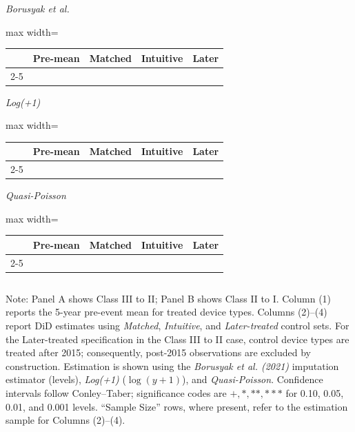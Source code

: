 \documentclass[letterpaper,12pt]{article}
\theoremstyle{definition}
\begin{document}
\begin{table}[t]
\begin{threeparttable}
\begin{minipage}[t]{0.49\textwidth}
\emph{Borusyak et al.}\par
\begin{adjustbox}{max width=\linewidth}
\begin{tabular}{@{}lcccc@{}}
\toprule
 & Pre-mean & Matched & Intuitive & Later \\
\cmidrule(lr){2-5}

\bottomrule
\end{tabular}
\end{adjustbox}\vspace{6pt}

\emph{Log(+1)}\par
\begin{adjustbox}{max width=\linewidth}
\begin{tabular}{@{}lcccc@{}}
\toprule
 & Pre-mean & Matched & Intuitive & Later \\
\cmidrule(lr){2-5}

\bottomrule
\end{tabular}
\end{adjustbox}\vspace{6pt}

\emph{Quasi-Poisson}\par
\begin{adjustbox}{max width=\linewidth}
\begin{tabular}{@{}lcccc@{}}
\toprule
 & Pre-mean & Matched & Intuitive & Later \\
\cmidrule(lr){2-5}

\bottomrule
\end{tabular}
\end{adjustbox}
\end{minipage}
\begin{tabular*}{\textwidth}{@{}l@{}}
\end{tabular*}

\begin{tablenotes}\footnotesize
\item[] Note: Panel A shows Class III to II; Panel B shows Class II to I. Column (1) reports the 5-year pre-event mean for treated device types. Columns (2)–(4) report DiD estimates using \emph{Matched}, \emph{Intuitive}, and \emph{Later-treated} control sets. For the Later-treated specification in the Class III to II case, control device types are treated after 2015; consequently, post-2015 observations are excluded by construction. Estimation is shown using the \emph{Borusyak et al. (2021)} imputation estimator (levels), \emph{Log(+1)} ($\log(y+1)$), and \emph{Quasi-Poisson}. Confidence intervals follow Conley–Taber; significance codes are $+,*,**,***$ for 0.10, 0.05, 0.01, and 0.001 levels. ``Sample Size'' rows, where present, refer to the estimation sample for Columns (2)–(4).
\end{tablenotes}
\end{threeparttable}
\label{tab:Robustness_Adverse}
\end{table}
\end{document}
